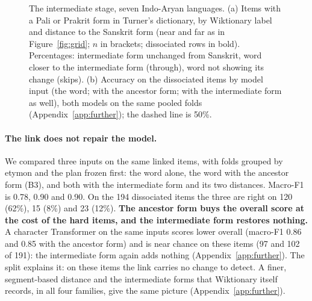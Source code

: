 \documentclass[11pt]{article}
\begin{document}
\begin{figure}[t]
\caption{The intermediate stage, seven Indo-Aryan languages. (a) Items with a Pali or Prakrit form in Turner's dictionary, by Wiktionary label and distance to the Sanskrit form (near and far as in Figure~\ref{fig:grid}; $n$ in brackets; dissociated rows in bold). Percentages: intermediate form unchanged from Sanskrit, word closer to the intermediate form (through), word not showing its change (skips). (b) Accuracy on the dissociated items by model input (the word; with the ancestor form; with the intermediate form as well), both models on the same pooled folds (Appendix~\ref{app:further}); the dashed line is 50\%.}
\label{tab:link}
\end{figure}

\paragraph{The link does not repair the model.} We compared three inputs on the same linked items, with folds grouped by etymon and the plan frozen first: the word alone, the word with the ancestor form (B3), and both with the intermediate form and its two distances. Macro-F1 is 0.78, 0.90 and 0.90. On the 194 dissociated items the three are right on 120 (62\%), 15 (8\%) and 23 (12\%). \textbf{The ancestor form buys the overall score at the cost of the hard items, and the intermediate form restores nothing.} A character Transformer on the same inputs scores lower overall (macro-F1 0.86 and 0.85 with the ancestor form) and is near chance on these items (97 and 102 of 191): the intermediate form again adds nothing (Appendix~\ref{app:further}). The split explains it: on these items the link carries no change to detect. A finer, segment-based distance and the intermediate forms that Wiktionary itself records, in all four families, give the same picture (Appendix~\ref{app:further}).
\end{document}
